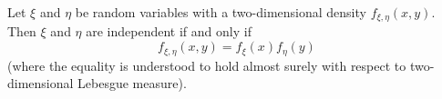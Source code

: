 Let $\xi$ and $\eta$ be random variables with a two-dimensional density $f_{\xi,\eta}(x,y)$. Then $\xi$ and $\eta$ are independent if and only if
$$f_{\xi,\eta}(x,y) = f_{\xi}(x) f_{\eta}(y)$$
(where the equality is understood to hold almost surely with respect to two-dimensional Lebesgue measure).
